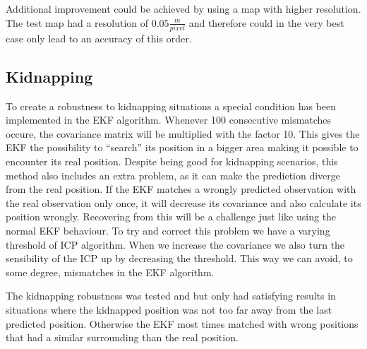Additional improvement could be achieved by using a map with higher resolution. The test map had a resolution of $0.05 \frac{m}{pixel}$ and therefore could in the very best case only lead to an accuracy of this order. 


\subsection{Kidnapping}
\label{subsec:Kidnapping}
To create a robustness to kidnapping situations a special condition has been implemented in the EKF algorithm. Whenever  100 consecutive mismatches occure, the covariance matrix will be multiplied with the factor 10. This gives the EKF the possibility to “search” its position in a bigger area making it possible to encounter its real position. Despite being good for kidnapping scenarios, this method also includes an extra problem, as it can make the prediction diverge from the real position. If the EKF matches a wrongly predicted observation with the real observation only once, it will decrease its covariance and also calculate its position wrongly. Recovering from this will be a challenge just like using the normal EKF behaviour. To try and correct this problem we have a varying threshold of ICP algorithm. When we increase the covariance we also turn the sensibility of the ICP up by decreasing the threshold. This way we can avoid, to some degree, mismatches in the EKF algorithm. 

The kidnapping robustness was tested and but only had satisfying results in situations where the kidnapped position was not too far away from the last predicted position. Otherwise the EKF most times matched with wrong positions that had a similar surrounding than the real position.

